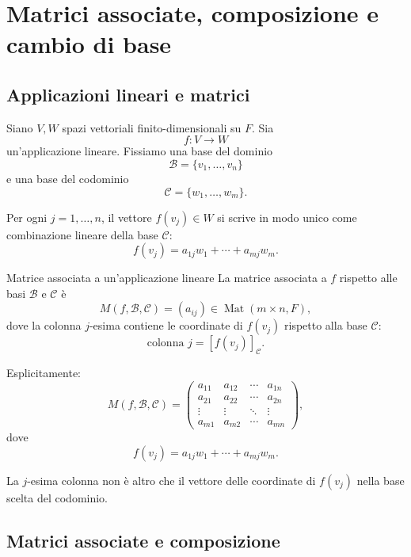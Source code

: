 \documentclass[a4paper]{article}
\begin{document}
\section{Matrici associate, composizione e cambio di base}

\subsection{Applicazioni lineari e matrici}

Siano \(V,W\) spazi vettoriali finito-dimensionali su \(F\). Sia
\[
    f:V\to W
\]
un'applicazione lineare. Fissiamo una base del dominio
\[
    \mathcal{B}=\{v_1,\ldots,v_n\}
\]
e una base del codominio
\[
    \mathcal{C}=\{w_1,\ldots,w_m\}.
\]

Per ogni \(j=1,\ldots,n\), il vettore \(f(v_j)\in W\) si scrive in modo unico come combinazione lineare della base \(\mathcal{C}\):
\[
    f(v_j)
    =
    a_{1j}w_1+\cdots+a_{mj}w_m.
\]

\begin{snippetdefinition}{Matrice associata a un'applicazione lineare}
    La matrice associata a \(f\) rispetto alle basi \(\mathcal{B}\) e \(\mathcal{C}\) è
    \[
        M(f,\mathcal{B},\mathcal{C})
        =
        (a_{ij})
        \in \operatorname{Mat}(m\times n,F),
    \]
    dove la colonna \(j\)-esima contiene le coordinate di \(f(v_j)\) rispetto alla base \(\mathcal{C}\):
    \[
        \text{colonna } j
        =
        [f(v_j)]_{\mathcal{C}}.
    \]
\end{snippetdefinition}

Esplicitamente:
\[
    M(f,\mathcal{B},\mathcal{C})
    =
    \begin{pmatrix}
        a_{11} & a_{12} & \cdots & a_{1n}\\
        a_{21} & a_{22} & \cdots & a_{2n}\\
        \vdots & \vdots & \ddots & \vdots\\
        a_{m1} & a_{m2} & \cdots & a_{mn}
    \end{pmatrix},
\]
dove
\[
    f(v_j)=a_{1j}w_1+\cdots+a_{mj}w_m.
\]

La \(j\)-esima colonna non è altro che il vettore delle coordinate di \(f(v_j)\) nella base scelta del codominio.

\subsection{Matrici associate e composizione}
\end{document}
